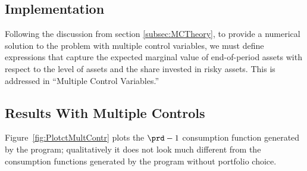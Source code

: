 \documentclass[titlepage, headings=optiontotocandhead]{econtex}
\begin{document}
\subsection{Implementation}

Following the discussion from section \ref{subsec:MCTheory}, to provide a numerical solution to the problem
with multiple control variables, we must define expressions that capture the expected marginal value of end-of-period
assets with respect to the level of assets and the share invested in risky assets. This is addressed in ``Multiple Control Variables.''





\hypertarget{results-with-multiple-controls}{}
\subsection{Results With Multiple Controls}\label{subsec:results-with-multiple-controls}

Figure~\ref{fig:PlotctMultContr} plots the $\prd-1$ consumption function generated by the program; qualitatively it does not look much different from the consumption functions generated by the program without portfolio choice.
\end{document}
